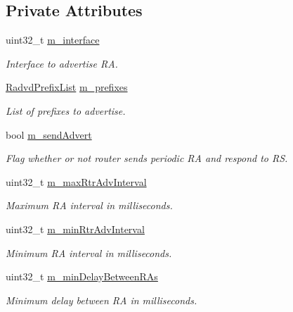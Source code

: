 \subsection*{Private Attributes}
\begin{DoxyCompactItemize}
\item 
uint32\+\_\+t \hyperlink{classns3_1_1RadvdInterface_abbff31a8371255eb386544f23a1838b2}{m\+\_\+interface}
\begin{DoxyCompactList}\small\item\em Interface to advertise RA. \end{DoxyCompactList}\item 
\hyperlink{classns3_1_1RadvdInterface_a25f72232730563f395b822cf912e9f5e}{Radvd\+Prefix\+List} \hyperlink{classns3_1_1RadvdInterface_a891bc9c1538359dd54d3b168601eb017}{m\+\_\+prefixes}
\begin{DoxyCompactList}\small\item\em List of prefixes to advertise. \end{DoxyCompactList}\item 
bool \hyperlink{classns3_1_1RadvdInterface_a59d1c4bd832e86bbad853fed0c334bb4}{m\+\_\+send\+Advert}
\begin{DoxyCompactList}\small\item\em Flag whether or not router sends periodic RA and respond to RS. \end{DoxyCompactList}\item 
uint32\+\_\+t \hyperlink{classns3_1_1RadvdInterface_a53bc442035e24d25f34f8c0a8cd20db6}{m\+\_\+max\+Rtr\+Adv\+Interval}
\begin{DoxyCompactList}\small\item\em Maximum RA interval in milliseconds. \end{DoxyCompactList}\item 
uint32\+\_\+t \hyperlink{classns3_1_1RadvdInterface_ad98b9173e0f124d93265d6e141feaac1}{m\+\_\+min\+Rtr\+Adv\+Interval}
\begin{DoxyCompactList}\small\item\em Minimum RA interval in milliseconds. \end{DoxyCompactList}\item 
uint32\+\_\+t \hyperlink{classns3_1_1RadvdInterface_ad4a9e81800501a6d88444c7ca207a9f3}{m\+\_\+min\+Delay\+Between\+R\+As}
\begin{DoxyCompactList}\small\item\em Minimum delay between RA in milliseconds. \end{DoxyCompactList}\item 

\end{DoxyCompactItemize}
